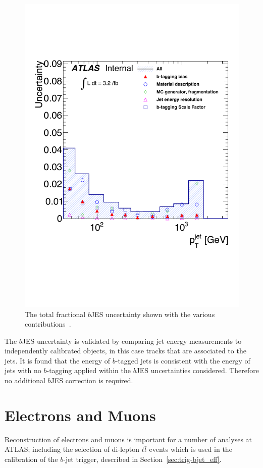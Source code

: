 \begin{figure}[!hbt]
  \begin{center}
    \includegraphics[width=0.55\linewidth, angle=0]{figs/Objects/bjets_bJES_uncert_edit.pdf}
  \vspace{-2em}
  \end{center}
  \caption[The total fractional $b$JES uncertainty shown with the various contributions.]
          {\label{fig:obj-bjets_bJES_uncert} The total fractional $b$JES uncertainty shown with the various contributions~\cite{dibjet-int_mori16}.}
\end{figure}

The $b$JES uncertainty is validated by comparing jet energy measurements to independently calibrated objects, in this case tracks that are associated to the jets.
It is found that the energy of $b$-tagged jets is consistent with the energy of jets with no $b$-tagging applied
within the $b$JES uncertainties considered. Therefore no additional $b$JES correction is required.

\section{Electrons and Muons}
\label{sec:obj-leptons}

Reconstruction of electrons and muons
is important for a number of analyses at ATLAS;
including the selection of di-lepton $t\bar{t}$ events
which is used in the calibration of  the $b$-jet trigger,
described in Section~\ref{sec:trig-bjet_eff}.

